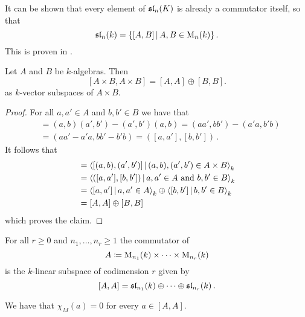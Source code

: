 \begin{remark}
  It can be shown that every element of $\operatorname{\mathfrak{sl}}_n(K)$ is already a commutator itself, so that
  \[
      \sllie_n(k)
    = \{ [A,B] \suchthat A, B \in \Mat_n(k) \} \,.
  \]
  This is proven in \cite{TraceZero}.
\end{remark}


\begin{lemma}
  Let $A$ and $B$ be $k$-algebras.
  Then
  \[
      [A \times B, A \times B]
    = [A,A] \oplus [B,B].
  \]
  as $k$-vector subspaces of $A \times B$.
\end{lemma}
\begin{proof}
  For all $a, a' \in A$ and $b, b' \in B$ we have that
  \begin{align*}
        [(a,b),(a',b')]
    &=  (a,b)(a',b') - (a',b')(a,b)
     =  (aa',bb') - (a'a, b'b) \\
    &=  (aa'-a'a, bb' - b'b)
     =  ([a,a'], [b,b']) \,.
  \end{align*}
  It follows that
  \begin{align*}
        [A \times B, A \times B]
    &=  \gen{
          [(a,b), (a',b')]
        \suchthat
          (a,b), (a',b') \in A \times B
        }_k \\
    &= \gen{
          ([a,a'], [b,b'])
        \suchthat
          a, a' \in A
          \text{ and }
          b, b' \in B
        }_k \\
    &=  \gen{ [a,a'] \suchthat a, a' \in A }_k
        \oplus
        \gen{ [b,b'] \suchthat b, b' \in B }_k \\
    &= [A,A] \oplus [B,B]
  \end{align*}
  which proves the claim.
\end{proof}


\begin{corollary}
  \label{corollary: commutator product of matrix algebras}
  For all $r \geq 0$ and $n_1, \dots, n_r \geq 1$ the commutator of
  \[
              A
     \coloneqq \operatorname{M}_{n_1}(k) \times \dotsb \times  \operatorname{M}_{n_r}(k)
  \]
  is the $k$-linear subspace of codimension $r$ given by
  \[
        [A,A]
     =  \operatorname{\mathfrak{sl}}_{n_1}(k) \oplus \dotsb \oplus \operatorname{\mathfrak{sl}}_{n_r}(k) \,.
  \]
\end{corollary}


\begin{lemma}
  \label{lemma: characters are zero on commutators}
  We have that $\chi_M(a) = 0$ for every $a \in [A,A]$.
\end{lemma}



